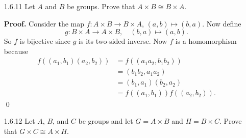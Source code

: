 \begin{enumerate}
      \begin{enumerate}
         \item Let $\sigma \in S_\triangle$. Notice that
               $\varphi(\sigma) = \theta\circ\sigma\circ\theta^{-1}$ maps
               $\Omega$ into $\Omega$, and is also a bijecton since it is a
               composition of bijective maps. Thus
               $\varphi(\sigma) \in S_\Omega$, so that $\varphi$ is well
               defined.
         \item Consider the map
               $$\alpha : S_\Omega \rightarrow S_\triangle \qquad
                 \text{by} \qquad \alpha(\sigma) = \theta \circ \sigma^{-1} 
                 \circ \theta^{-1} \text{ for all } \sigma \in S_\Omega.$$
               A trivial computation will show us that $\varphi\circ\alpha$ is
               the identity map on $S_\Omega$ and $\alpha\circ\varphi$ is the
               identity map on $S_\triangle$. Thus $\varphi$ is a bijection.
         \item Let $\sigma, \tau \in S_\triangle$. So
               \begin{align*}
                  \varphi(\sigma\circ\tau) &=
                     \theta\circ\sigma\circ\tau\circ\theta^{-1} \\
                     &= \theta\circ\sigma\circ\theta^{-1}\circ\theta\circ
                        \tau\circ\theta^{-1} \\
                     &= \varphi(\sigma) \circ \varphi(\tau),
               \end{align*}
               as desired.
      \end{enumerate} \qed
   \item[1.6.11]  Let $A$ and $B$ be groups. Prove that
                  $A \times B \cong B\times A$.

      \textbf{Proof.} Consider the map $f : A \times B \rightarrow B \times A$,
      $(a, b) \mapsto (b, a)$. Now define
      $$g : B \times A\rightarrow A\times B, \quad (b, a) \mapsto (a, b).$$
      So $f$ is bijective since $g$ is its two-sided inverse. Now $f$ is a
      homomorphism because
      \begin{align*}
         f((a_1, b_1)(a_2, b_2)) &= f((a_1a_2, b_1b_2)) \\
            &= (b_1b_2, a_1a_2) \\
            &= (b_1, a_1)(b_2, a_2) \\
            &= f((a_1, b_1))f((a_2, b_2)).
      \end{align*} \qed
   \item[1.6.12]  Let $A$, $B$, and $C$ be groups and let $G = A \times B$ and
                  $H = B \times C$. Prove that $G \times C \cong A \times H$.


\end{enumerate}
